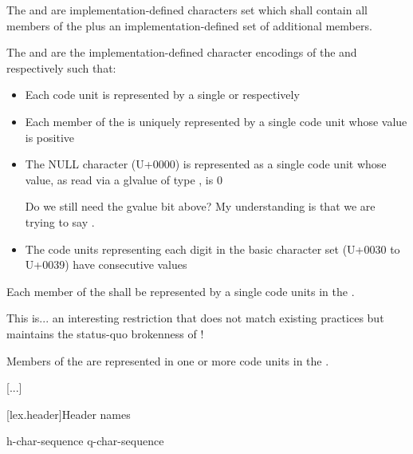 \documentclass{wg21}
\begin{document}
\begin{addedblock}

The  and  are implementation-defined characters set which shall contain all members
of the  plus an implementation-defined set of additional members.

The  and  are the implementation-defined character encodings of the  and  respectively such that:

\begin{itemize}
\item Each code unit is represented by a single  or  respectively
\item Each member of the  is uniquely represented by a single code unit whose value is positive
\item The NULL character (U+0000) is represented as a single code unit whose value, as read via a glvalue of type , is 0

\begin{quoteblock}
Do we still need the gvalue bit above? My understanding is that we are trying to say .
\end{quoteblock}

\item The code units representing each digit in the basic character set (U+0030 to U+0039) have consecutive values
\end{itemize}

Each member of the  shall be represented by a single code units in the .
\begin{quoteblock}
This is... an interesting restriction that does not match existing practices but maintains the status-quo brokenness of !
\end{quoteblock}
Members of the  are represented in one or more code units in the .

\end{addedblock}

[...]



[lex.header]{Header names}

%
\begin{bnf}
    \br
    \terminal{<} h-char-sequence \terminal{>}\br
     q-char-sequence 
\end{bnf}
\end{document}
